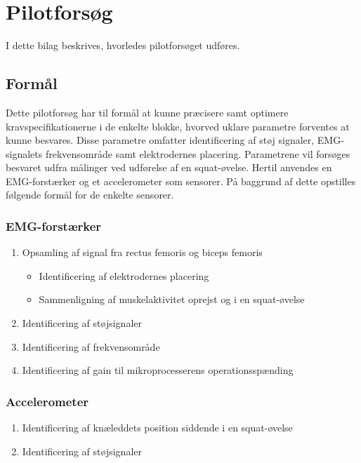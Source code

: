 \section{Pilotforsøg}
I dette bilag beskrives, hvorledes pilotforsøget udføres.

\subsection{Formål}
Dette pilotforsøg har til formål at kunne præcisere samt optimere kravspecifikationerne i de enkelte blokke, hvorved uklare parametre forventes at kunne besvares. Disse parametre omfatter identificering af støj signaler, EMG-signalets frekvensområde samt elektrodernes placering. Parametrene vil forsøges besvaret udfra målinger ved udførelse af en squat-øvelse.
Hertil anvendes en EMG-forstærker og et accelerometer som sensorer. På baggrund af dette opstilles følgende formål for de enkelte sensorer.  

\subsubsection{EMG-forstærker}
\begin{enumerate}
\item Opsamling af signal fra rectus femoris og biceps femoris
\begin{itemize}
\item Identificering af elektrodernes placering
\item Sammenligning af muskelaktivitet oprejst og i en squat-øvelse 
\end{itemize}
\item Identificering af støjsignaler
\item Identificering af frekvensområde
\item Identificering af gain til mikroprocesserens operationsspænding
\end{enumerate}

\subsubsection{Accelerometer}
\begin{enumerate}
\item Identificering af knæleddets position siddende i en squat-øvelse
\item Identificering af støjsignaler
\end{enumerate}

